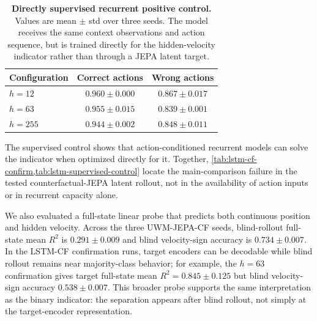 \begin{table}[h]
\centering
\small
\caption{\textbf{Directly supervised recurrent positive control.}
Values are mean $\pm$ std over three seeds. The model receives the same
context observations and action sequence, but is trained directly for
the hidden-velocity indicator rather than through a JEPA latent target.}
\label{tab:lstm-supervised-control}
\begin{tabular}{lcc}
\toprule
Configuration & Correct actions & Wrong actions \\
\midrule
$h{=}12$  & $0.960\pm0.000$ & $0.867\pm0.017$ \\
$h{=}63$  & $0.955\pm0.015$ & $0.839\pm0.001$ \\
$h{=}255$ & $0.944\pm0.002$ & $0.848\pm0.011$ \\
\bottomrule
\end{tabular}
\end{table}

The supervised control shows that action-conditioned recurrent models
can solve the indicator when optimized directly for it. Together,
\cref{tab:lstm-cf-confirm,tab:lstm-supervised-control} locate the
main-comparison failure in the tested counterfactual-JEPA latent
rollout, not in the availability of action inputs or in recurrent
capacity alone.

We also evaluated a full-state linear probe that predicts both
continuous position and hidden velocity. Across the three UWM-JEPA-CF
seeds, blind-rollout full-state mean $R^2$ is $0.291\pm0.009$ and blind
velocity-sign accuracy is $0.734\pm0.007$. In the LSTM-CF confirmation
runs, target encoders can be decodable while blind rollout remains near
majority-class behavior; for example, the $h{=}63$ confirmation gives
target full-state mean $R^2=0.845\pm0.125$ but blind velocity-sign
accuracy $0.538\pm0.007$. This broader probe supports the same
interpretation as the binary indicator: the separation appears after
blind rollout, not simply at the target-encoder representation.
